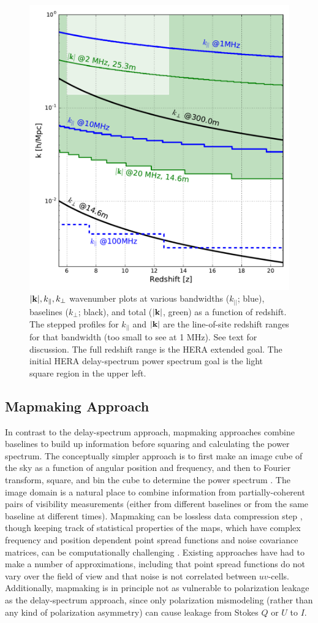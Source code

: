 \documentclass[preprint,11pt]{aastex}
\newcommand{\kvec}{{\bf k}}
\def\kperp{k_{\bot}}
\def\kpar{k_{\|}}
\begin{document}
\begin{figure}[h!]
\centerline{
\includegraphics[width=.4\textwidth]{plots/kperf.pdf} 
}
\caption{\small $|\kvec |, \kpar, \kperp$ wavenumber plots at various bandwidths ($k_{||}$; blue), baselines ($\kperp$; black), and total ($|\kvec |$, green) as a function of redshift.  The stepped profiles for $k_{||}$ and $|\kvec |$ are the line-of-site redshift ranges for that bandwidth (too small to see at 1 MHz).  See text for discussion.  The full redshift range is the HERA extended goal.  The initial HERA delay-spectrum power spectrum goal is the light square region in the upper left.}
\label{fig:kperf}
\end{figure}

\subsection{Mapmaking Approach}
\label{sec:mapapproach}
In contrast to the delay-spectrum approach, mapmaking approaches combine baselines to build up information before squaring and calculating the power spectrum.  The conceptually simpler approach is to first make an image cube of the sky as a function of angular position and frequency, and then to Fourier transform, square, and bin the cube to determine the power spectrum \cite{liu_tegmark2011,dillon_et_al2013a}. The image domain is a natural place to combine information from partially-coherent pairs of visibility measurements (either from different baselines or from the same baseline at different times). Mapmaking can be lossless data compression step \citep{tegmark1997b}, though keeping track of statistical properties of the maps, which have complex frequency and position dependent point spread functions and noise covariance matrices, can be computationally challenging \citep{dillon_et_al2015a}. Existing approaches have had to make a number of approximations, including that point spread functions do not vary over the field of view and that noise is not correlated between $uv$-cells. Additionally, mapmaking is in principle not as vulnerable to polarization leakage as the delay-spectrum approach, since only polarization mismodeling (rather than any kind of polarization asymmetry) can cause leakage from Stokes $Q$ or $U$ to $I$.
\end{document}
